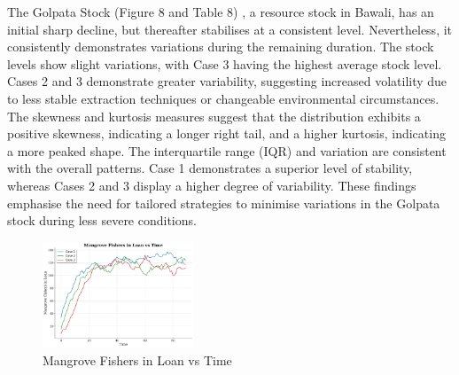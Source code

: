 \documentclass[final,5p,times,twocolumn,authoryear]{elsarticle}
\begin{document}
The Golpata Stock (Figure 8 and Table 8) , a resource stock in Bawali, has an initial sharp decline, but thereafter stabilises at a consistent level. Nevertheless, it consistently demonstrates variations during the remaining duration. The stock levels show slight variations, with Case 3 having the highest average stock level. Cases 2 and 3 demonstrate greater variability, suggesting increased volatility due to less stable extraction techniques or changeable environmental circumstances. The skewness and kurtosis measures suggest that the distribution exhibits a positive skewness, indicating a longer right tail, and a higher kurtosis, indicating a more peaked shape. The interquartile range (IQR) and variation are consistent with the overall patterns. Case 1 demonstrates a superior level of stability, whereas Cases 2 and 3 display a higher degree of variability. These findings emphasise the need for tailored strategies to minimise variations in the Golpata stock during less severe conditions.\\
\begin{figure}[htbp]
    \centering
    \includegraphics[width=0.4\textwidth]{graph_all/plots_mod/mangrove_fishers_in_loan_vs_time.png}
    \caption{Mangrove Fishers in Loan vs Time}
    \label{fig:mangrove_loan}
\end{figure}
\end{document}
